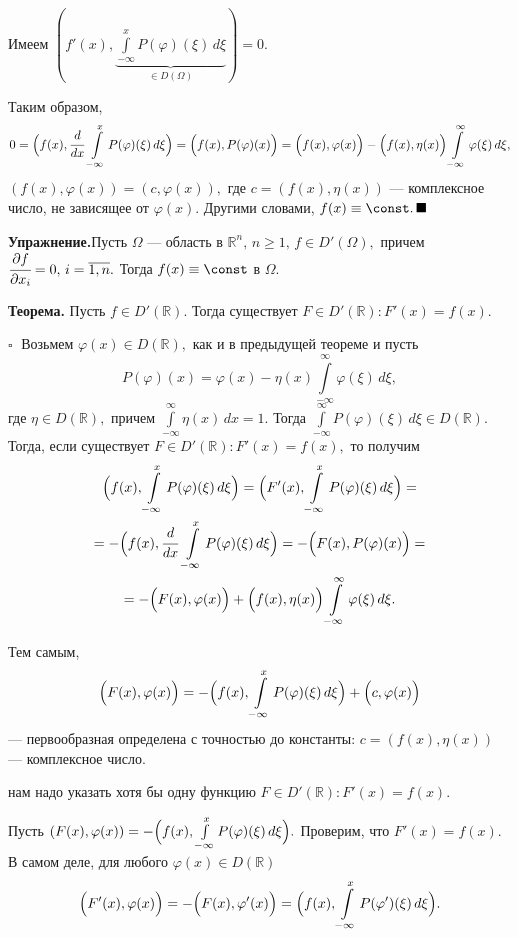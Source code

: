 \documentclass[12pt,a4paper,draft]{article}
\DeclareRobustCommand*{\т}{~--- }
\DeclareRobustCommand*{\ч}{~-- }
\begin{document}
Имеем $(f'(x),\underbrace{\int\limits_{-\infty}^x P(\varphi)(\xi)
\,d\xi}_{\in D(\Omega)})=0$.

Таким образом, $$0=\Bigl(f(x),\cfrac d{dx}\,\int\limits_{-\infty}^x
P(\varphi)(\xi)\,d\xi\Bigr)
=\Bigl(f(x),P(\varphi)(x)\Bigr)=\Bigl(f(x),\varphi(x)\Bigr)-\Bigl(f(x),\eta(x)\Bigr)\int\limits_{-\infty}^{\infty}\varphi(\xi)
\,d\xi,$$
$(f(x),\varphi(x))=(c,\varphi(x)),$ где $c=(f(x),\eta(x))$ ---
комплексное число, не зависящее от $\varphi(x).$ Другими словами,
$f(x)\equiv \const  . \,\blacksquare$

\textbf{Упражнение.}Пусть $\Omega$ --- область в $\mathbb
R^n,\,n\ge1,\,f\in D'(\Omega),$ причем $\cfrac{\partial
f}{\partial x_i}=0,\, i=\overline{1,n}.$ Тогда $f(x)\equiv \const
$ в $\Omega$.

\textbf{Теорема.} Пусть $f\in D'(\mathbb R).$ Тогда существует
$F\in D'(\mathbb R)\colon F'(x)=f(x).$

$\square\;$
Возьмем $\varphi(x)\in D(\mathbb R),$ как и в предыдущей теореме и
пусть
$$P(\varphi)(x)=\varphi(x)-\eta(x)\int\limits_{-\infty}^{\infty}\varphi(\xi)
\,d\xi,$$
где $\eta\in D(\mathbb R),$ причем
$\int\limits_{-\infty}^{\infty}\eta(x)\,dx=1.$ Тогда
$\int\limits_{-\infty}^{\infty}P(\varphi)(\xi)\,d\xi \in D(\mathbb
R).$ Тогда, если существует $F\in D'(\mathbb R)\colon F'(x)=f(x),$
то получим
\begin{multline}
\Bigl(f(x),\int\limits_{-\infty}^x
P(\varphi)(\xi)\,d\xi\Bigr) =\Bigl(F'(x),\int\limits_{-\infty}^x
P(\varphi)(\xi)\,d\xi\Bigr) =\\=
-\Bigl(f(x),\cfrac
d{dx}\,\int\limits_{-\infty}^x P(\varphi)
(\xi)\,d\xi\Bigr)=-\Bigl(F(x),P(\varphi)(x)\Bigr)=\\=
-\Bigl(F(x),\varphi(x)\Bigr)+\Bigl(f(x),\eta(x)\Bigr)\int\limits_{-\infty}^{\infty}\varphi(\xi)\,d\xi.
\end{multline}

Тем самым,
$$\Bigl(F(x),\varphi(x)\Bigr)=-\Bigl(f(x),\int\limits_{-\infty}^x
P(\varphi)(\xi)\,d\xi\Bigr)+\Bigl(c,\varphi(x)\Bigr)$$
 --- первообразная определена с точностью до константы:
$c=(f(x),\eta(x))$
--- комплексное число.

нам надо указать хотя бы одну функцию $F\in D'(\mathbb R)\colon
F'(x)=f(x).$

Пусть $(F(x),\varphi(x))=-\Bigl(f(x),\int\limits_{-\infty}^x
P(\varphi)(\xi)\,d\xi\Bigr).$ Проверим, что $F'(x)=f(x).$ В самом
деле, для любого $\varphi(x)\in D(\mathbb R)$
$$\Bigl(F'(x),\varphi(x)\Bigr)=-\Bigl(F(x),\varphi'(x)\Bigr)=\Bigl(f(x),\int\limits_{-\infty}^x
P(\varphi')(\xi)\,d\xi\Bigr).$$
\end{document}
